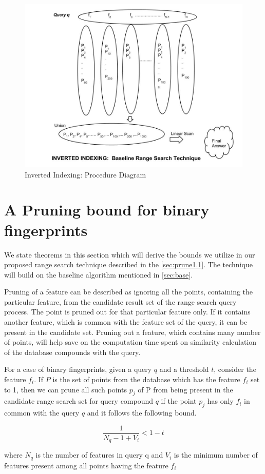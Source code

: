 \begin{figure}[ht]	
\centering
\includegraphics[width=1 \columnwidth]{img/image0c.jpg}
\caption{Inverted Indexing: Procedure Diagram}
\label{fig: invert}
\end{figure}




\section{A Pruning bound for binary fingerprints}
\label{sec:prune1}
We state theorems in this section which will derive the bounds we utilize in our proposed range search technique described in the \autoref{sec:prune1.1}. The technique will build on the baseline algorithm mentioned in \autoref{sec:base}.

Pruning of a feature can be described as ignoring all the points, containing  the particular feature, from the candidate result set of the range search query process. The point is pruned out for that particular feature only. If it contains another feature, which is common with the feature set of the query, it can be present in the candidate set. Pruning out a feature, which contains many number of points, will help save on the computation time spent on similarity calculation of the database compounds with the query.


\begin{thm}
\label{thm1bound}
For a case of binary fingerprints, given a query $q$ and a threshold $t$, consider the feature $f_i$. If $P$ is the set of points from the database which has the feature $f_i$ set to 1, then we can prune all such points $p_j$ of P from being present in the candidate range search set for query compound $q$ if the point $p_j$ has only $f_i$ in common with the query $q$ and it follows the following bound. 

\begin{equation}
\label{eq:boun}
\frac{1}{N_q - 1 + V_{i}}  < 1-t
\end{equation}

where $N_q$ is the number of features in query q and $V_{i}$ is the minimum number of features present among all points having the feature $f_i$

\end{thm}


